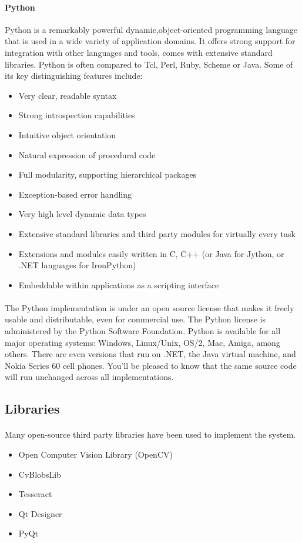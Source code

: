 \documentclass[a4paper,10pt]{iesreport}
\begin{document}
\paragraph*{Python}
Python is a remarkably powerful dynamic,object-oriented programming language that is used in a wide variety of application domains. It offers strong support for integration with other languages and tools, comes with extensive standard libraries. Python is often compared to Tcl, Perl, Ruby, Scheme or Java.
Some of its key distinguishing features include:
\begin{itemize}
 \item Very clear, readable syntax
\item Strong introspection capabilities
 \item Intuitive object orientation
\item Natural expression of procedural code
\item Full modularity, supporting hierarchical packages
\item Exception-based error handling
\item Very high level dynamic data types
\item Extensive standard libraries and third party modules for virtually every task
\item Extensions and modules easily written in C, C++ (or Java for Jython, or .NET languages for IronPython)
\item Embeddable within applications as a scripting interface
\end{itemize}
\paragraph*{}
The Python implementation is under an open source license that makes it freely usable and distributable, even for commercial use. The Python license is administered by the Python Software Foundation.
Python is available for all major operating systems: Windows, Linux/Unix, OS/2, Mac, Amiga, among others. There are even versions that run on .NET, the Java virtual machine, and Nokia Series 60 cell phones. You'll be pleased to know that the same source code will run unchanged across all implementations.
\subsection{Libraries}
\paragraph*{}
Many open-source third party libraries have been used to implement the system.
\begin{itemize}
 \item Open Computer Vision Library (OpenCV)
 \item CvBlobsLib
 \item Tesseract
 \item Qt Designer
 \item PyQt
\end{itemize}
\end{document}
